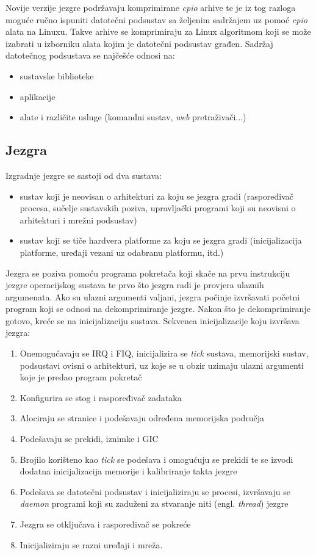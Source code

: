 \documentclass[times, utf8, diplomski, numeric]{fer}
\begin{document}
Novije verzije jezgre podržavaju komprimirane \textit{cpio} arhive te je iz tog razloga moguće ručno ispuniti datotečni
podsustav sa željenim sadržajem uz pomoć \textit{cpio} alata na Linuxu. Takve arhive se komprimiraju za Linux algoritmom
koji se može izabrati u izborniku alata kojim je datotečni podsustav građen.
Sadržaj datotečnog podsustava se najčešće odnosi na:
\begin{itemize}
  \item{sustavske biblioteke}
  \item{aplikacije}
  \item{alate i različite usluge (komandni sustav, \textit{web} pretraživači...)}
\end{itemize}

\subsection{Jezgra}
Izgradnje jezgre se sastoji od dva sustava:
\begin{itemize}
  \item{sustav koji je neovisan o arhitekturi za koju se jezgra gradi (raspoređivač procesa, sučelje sustavskih poziva,
  upravljački programi koji su neovisni o arhitekturi i mrežni podsustav)}
  \item{sustav koji se tiče hardvera platforme za koju se jezgra gradi (inicijalizacija platforme, uređaji vezani uz odabranu
  platformu, itd.)}
\end{itemize}
Jezgra se poziva pomoću programa pokretača koji skače na prvu instrukciju jezgre operacijskog sustava te prvo što jezgra radi je
provjera ulaznih argumenata. Ako su ulazni argumenti valjani, jezgra počinje izvršavati početni program koji se odnosi na
dekomprimiranje jezgre. Nakon što je dekomprimiranje gotovo, kreće se na inicijalizaciju sustava. Sekvenca inicijalizacije
koju izvršava jezgra:
\begin{enumerate}
  \item{Onemogućavaju se IRQ i FIQ, inicijalizira se \textit{tick} sustava, memorijski sustav, podsustavi ovisni o arhitekturi,
  uz koje se u obzir uzimaju ulazni argumenti koje je predao program pokretač}
  \item{Konfigurira se stog i raspoređivač zadataka}
  \item{Alociraju se stranice i podešavaju određena memorijska područja}
  \item{Podešavaju se prekidi, iznimke i GIC}
  \item{Brojilo korišteno kao \textit{tick} se podešava i omogućuju se prekidi te se izvodi dodatna inicijalizacija memorije i
  kalibriranje takta jezgre}
  \item{Podešava se datotečni podsustav i inicijaliziraju se procesi, izvršavaju se \textit{daemon} programi koji su zaduženi
  za stvaranje niti (engl. \textit{thread}) jezgre}
  \item{Jezgra se otključava i raspoređivač se pokreće}
  \item{Inicijaliziraju se razni uređaji i mreža.}
\end{enumerate}
\end{document}
